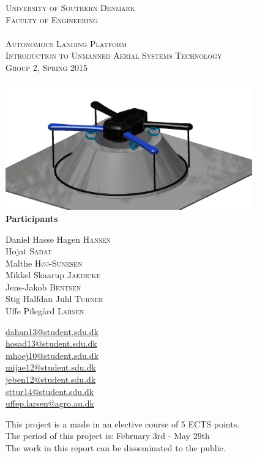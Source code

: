 \begin{titlepage}
\begin{center}
	
	\textsc{\LARGE{University of Southern Denmark\\Faculty of Engineering}}\\[1.5cm]
	\HRule \\[0.4cm]
	\textsc{\huge{Autonomous Landing Platform}}\\
	\textsc{\Large{Introduction to Unmanned Aerial Systems Technology\\Group 2, Spring 2015}}\\[0.4cm]
	\HRule \\[1.5cm]
	\includegraphics[width=0.8\textwidth]{imgs/frontpage}~\\[1.5cm]
	\textbf{Participants}\\
	\begin{minipage}[t]{0.48\textwidth}
		\begin{flushright}
			Daniel Hasse Hagen \textsc{Hansen}\\
			Hojat \textsc{Sadat}\\
			Malthe \textsc{Høj-Sunesen}\\
			Mikkel Skaarup \textsc{Jaedicke}\\
			Jens-Jakob \textsc{Bentsen}\\
			Stig Halfdan Juhl \textsc{Turner}\\
			Uffe Pilegård \textsc{Larsen}
		\end{flushright}
	\end{minipage}
	\hfill
	\begin{minipage}[t]{0.48\textwidth}
		\begin{flushleft}
			\url{dahan13@student.sdu.dk}\\
			\url{hosad13@student.sdu.dk}\\
			\url{mhoej10@student.sdu.dk}\\
			\url{mijae12@student.sdu.dk}\\
			\url{jeben12@student.sdu.dk}\\
			\url{sttur14@student.sdu.dk}\\
			\url{uffep.larsen@agro.au.dk}\\
		\end{flushleft} 
	\end{minipage}
	\vfill
	\large{This project is a made in an elective course of 5 ECTS points. \\
		The period of this project is: February 3rd - May 29th\\
		The work in this report can be disseminated to the public.}
\end{center}
\end{titlepage}